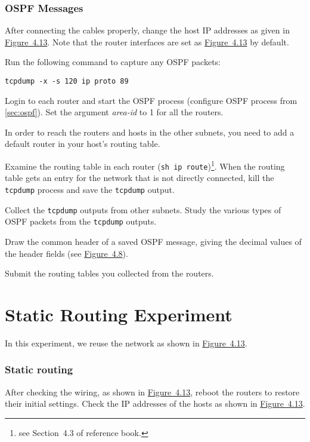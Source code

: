 \documentclass{../UTNetLab}
\begin{document}
\section{OSPF Messages}
    After connecting the cables properly, change the host IP addresses as given in \hyperref[fig:4.13]{Figure~4.13}.
    Note that the router interfaces are set as \hyperref[fig:4.13]{Figure~4.13} by default.

    Run the following command to capture any OSPF packets: 
    \begin{lstlisting}
tcpdump -x -s 120 ip proto 89
    \end{lstlisting}

    Login to each router and start the OSPF process (configure OSPF process from \autoref{sec:ospf}).
    Set the argument \textit{area-id} to 1 for all the routers.

    In order to reach the routers and hosts in the other subnets, you need to add a default router in your host’s routing table.

    Examine the routing table in each router (\lstinline[language={cisco}]{sh ip route})\footnote{see Section~4.3 of reference book.}.
    When the routing table gets an entry for the network that is not directly connected, kill the \lstinline{tcpdump} process and save the \lstinline{tcpdump} output.

    Collect the \lstinline{tcpdump} outputs from other subnets.
    Study the various types of OSPF packets from the \lstinline{tcpdump} outputs.
    
    \begin{report}
        \item Draw the common header of a saved OSPF message, giving the decimal values of the header fields (see \hyperref[fig:4.8]{Figure~4.8}).
        
        \item Submit the routing tables you collected from the routers.
    \end{report}

\part{Static Routing Experiment}\label{sec:static}
    In this experiment, we reuse the network as shown in \hyperref[fig:4.13]{Figure~4.13}.
\section{Static routing}
    After checking the wiring, as shown in \hyperref[fig:4.13]{Figure~4.13}, reboot the routers to restore their initial settings.
    Check the IP addresses of the hosts as shown in \hyperref[fig:4.13]{Figure~4.13}.
\end{document}
